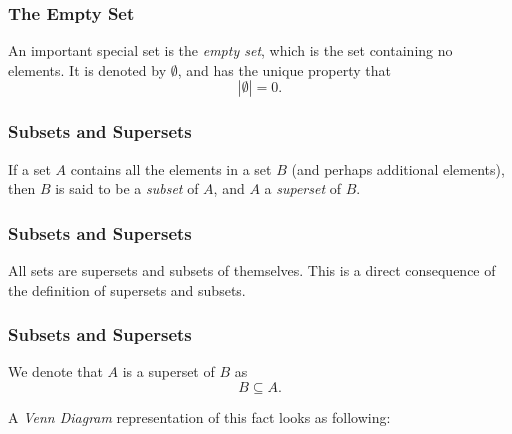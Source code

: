 \begin{frame}
  \frametitle{The Empty Set}
  An important special set  is the \emph{empty set}, which is the set containing no elements. It is denoted by $\emptyset$, and has the unique property that
  \begin{equation*}
    \left| \emptyset \right| = 0.
  \end{equation*}
\end{frame}

\begin{frame}
  \frametitle{Subsets and Supersets}
  If a set $A$ contains all the elements in a set $B$ (and perhaps additional elements), then $B$ is said to be a \emph{subset} of $A$, and $A$ a \emph{superset} of $B$.

\end{frame}

\begin{frame}
  \frametitle{Subsets and Supersets}
  \begin{presentation_note}
    All sets are supersets and subsets of themselves. This is a direct consequence of the definition of supersets and subsets.
  \end{presentation_note}
\end{frame}

\begin{frame}
  \frametitle{Subsets and Supersets}
  We denote that $A$ is a superset of $B$ as
  \begin{equation*}
    B\subseteq A.
  \end{equation*}

  A \emph{Venn Diagram} representation of this fact looks as following:
  \begin{figure}[H]
    \centering
  \end{figure}
\end{frame}

